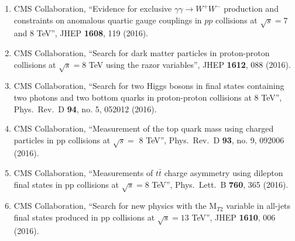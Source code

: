 \begin{itemize}
\begin{enumerate}
\item CMS Collaboration, ``Evidence for exclusive $\gamma\gamma \to W^+ W^-$ production and constraints on anomalous quartic gauge couplings in $pp$ collisions at $ \sqrt{s}=7 $ and 8 TeV'', JHEP {\bf 1608}, 119 (2016).

\item CMS Collaboration, ``Search for dark matter particles in proton-proton collisions at $ \sqrt{s}=8 $ TeV using the razor variables'', JHEP {\bf 1612}, 088 (2016).

\item CMS Collaboration, ``Search for two Higgs bosons in final states containing two photons and two bottom quarks in proton-proton collisions at 8 TeV'', Phys.\ Rev.\ D {\bf 94}, no. 5, 052012 (2016).

\item CMS Collaboration, ``Measurement of the top quark mass using charged particles in pp collisions at $\sqrt s =$ 8 TeV'', Phys.\ Rev.\ D {\bf 93}, no. 9, 092006 (2016).

\item CMS Collaboration, ``Measurements of $t \bar t$ charge asymmetry using dilepton final states in pp collisions at $\sqrt s=8$ TeV'', Phys.\ Lett.\ B {\bf 760}, 365 (2016).

\item CMS Collaboration, ``Search for new physics with the M$_{T2}$ variable in all-jets final states produced in pp collisions at $ \sqrt{s}=13 $ TeV'', JHEP {\bf 1610}, 006 (2016).


\end{enumerate}
\end{itemize}
